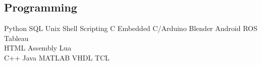 \documentclass[]{deedy-resume-openfont}
\begin{document}
\begin{minipage}[t]{0.35\textwidth}

\subsection{Programming}
\textbullet{}Python \textbullet{}SQL \textbullet{}Unix Shell Scripting \textbullet{}C \textbullet{}Embedded C/Arduino \textbullet{}Blender \textbullet{}Android  \textbullet{}ROS \textbullet{}Tableau\\ 
  \textbullet{}HTML \textbullet{}Assembly \textbullet{}Lua\\
\textbullet{}C++ \textbullet{}Java
\textbullet{}MATLAB \textbullet{}VHDL \textbullet{}TCL
\vspace{0.05in}
%
%

\end{minipage} 
\hfill\vline\hfill
\end{document}
